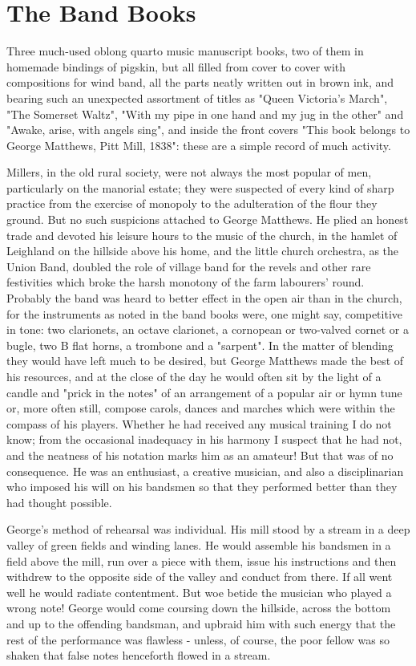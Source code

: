 \section{The Band Books}

Three much-used oblong quarto music manuscript books, two of them in homemade bindings of pigskin, but all filled from cover to cover with compositions for wind band, all the parts neatly written out in brown ink, and bearing such an unexpected assortment of titles as "Queen Victoria's March", "The Somerset Waltz", "With my pipe in one hand and my jug in the other" and "Awake, arise, with angels sing", and inside the front covers "This book belongs to George Matthews, Pitt Mill, 1838": these are a simple record of much activity.

Millers, in the old rural society, were not always the most popular of men, particularly on the manorial estate; they were suspected of every kind of sharp practice from the exercise of monopoly to the adulteration of the flour they ground. But no such suspicions attached to George Matthews. He plied an honest trade and devoted his leisure hours to the music of the church, in the hamlet of Leighland on the hillside above his home, and the little church orchestra, as the Union Band, doubled the role of village band for the revels and other rare festivities which broke the harsh monotony of the farm labourers’ round. Probably the band was heard to better effect in the open air than in the church, for the instruments as noted in the band books were, one might say, competitive in tone: two clarionets, an octave clarionet, a cornopean or two-valved cornet or a bugle, two B flat horns, a trombone and a "sarpent". In the matter of blending they would have left much to be desired, but George Matthews made the best of his resources, and at the close of the day he would often sit by the light of a candle and "prick in the notes" of an arrangement of a popular air or hymn tune or, more often still, compose carols, dances and marches which were within the compass of his players. Whether he had received any musical training I do not know; from the occasional inadequacy in his harmony I suspect that he had not, and the neatness of his notation marks him as an amateur! But that was of no consequence. He was an enthusiast, a creative musician, and also a disciplinarian who imposed his will on his bandsmen so that they performed better than they had thought possible.

George's method of rehearsal was individual. His mill stood by a stream in a deep valley of green fields and winding lanes. He would assemble his bandsmen in a field above the mill, run over a piece with them, issue his instructions and then withdrew to the opposite side of the valley and conduct from there. If all went well he would radiate contentment. But woe betide the musician who played a wrong note! George would come coursing down the hillside, across the bottom and up to the offending bandsman, and upbraid him with such energy that the rest of the performance was flawless - unless, of course, the poor fellow was so shaken that false notes henceforth flowed in a stream.

